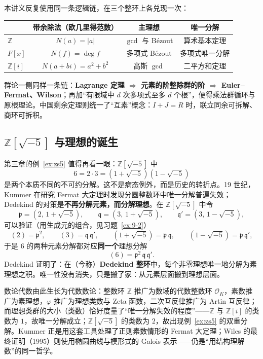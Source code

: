 \documentclass[a4paper,11pt]{ctexart}
\numberwithin{equation}{section}
\theoremstyle{plain}
\theoremstyle{definition}
\theoremstyle{remark}
\newcommand{\Z}{\mathbb{Z}}
\newcommand{\Ga}{\mathbb{Z}[i]}
\newcommand{\Gf}{\mathbb{Z}[\sqrt{-5}]}
\begin{document}
本讲义反复使用同一条逻辑链，在三个整环上各兑现一次：

\begin{center}
\renewcommand{\arraystretch}{1.5}
\begin{tabular}{lccc}
\hline
 & 带余除法（欧几里得范数） & 主理想 & 唯一分解 \\
\hline
$\Z$ & $N(a)=|a|$ & $\gcd$ 与 Bézout & 算术基本定理 \\
$F[x]$ & $N(f)=\deg f$ & 多项式 Bézout & 多项式唯一分解 \\
$\Ga$ & $N(a+bi)=a^2+b^2$ & 高斯 $\gcd$ & 二平方和定理 \\
\hline
\end{tabular}
\end{center}

群论一侧同样一条链：\textbf{Lagrange 定理 $\Rightarrow$ 元素的阶整除群的阶 $\Rightarrow$ Euler--Fermat、Wilson}；再加“有限域中 $d$ 次多项式至多 $d$ 个根”，便得乘法群循环与原根理论。中国剩余定理则统一了“互素”概念：$I+J=R$ 时，联立同余可拆解、商环可拆积。

\subsection{$\Z[\sqrt{-5}]$ 与理想的诞生}

第三章的例~\ref{ex:zs5} 值得再看一眼：$\Gf$ 中
\[
6=2\cdot3=(1+\sqrt{-5})(1-\sqrt{-5})
\]
是两个本质不同的不可约分解。这不是病态例外，而是历史的转折点。19 世纪，Kummer 在研究 Fermat 大定理时发现分圆整数环中唯一分解普遍失效；Dedekind 的对策是\textbf{不再分解元素，而分解理想}。在 $\Gf$ 中令
\[
\mathfrak p=(2,\,1+\sqrt{-5}),\qquad
\mathfrak q=(3,\,1+\sqrt{-5}),\qquad
\mathfrak q'=(3,\,1-\sqrt{-5}),
\]
可以验证（用生成元的组合，见习题~\ref{ex:9-2}）
\[
(2)=\mathfrak p^2,\qquad (3)=\mathfrak q\,\mathfrak q',\qquad
(1+\sqrt{-5})=\mathfrak p\,\mathfrak q,\qquad
(1-\sqrt{-5})=\mathfrak p\,\mathfrak q' ,
\]
于是 $6$ 的两种元素分解都对应\textbf{同一个}理想分解
\[
(6)=\mathfrak p^2\,\mathfrak q\,\mathfrak q' .
\]
Dedekind 证明了：在（今称）\textbf{Dedekind 整环}中，每个非零理想唯一地分解为素理想之积。唯一性没有消失，只是搬了家：从元素层面搬到理想层面。

数论代数由此生长为代数数论：整数环 $\Z$ 推广为数域的代数整数环 $\mathcal O_K$，素数推广为素理想，$\varphi$ 推广为理想类数与 Zeta 函数，二次互反律推广为 Artin 互反律；而理想类群的大小（类数）恰好度量了“唯一分解失效的程度”——$\Z$ 与 $\Ga$ 的类数为 $1$，故唯一分解成立；$\Gf$ 的类数为 $2$，故出现例~\ref{ex:zs5} 的双重分解。Kummer 正是用这套工具处理了正则素数情形的 Fermat 大定理；Wiles 的最终证明（1995）则使用椭圆曲线与模形式的 Galois 表示——仍是“用结构理解数”的同一哲学。
\end{document}

